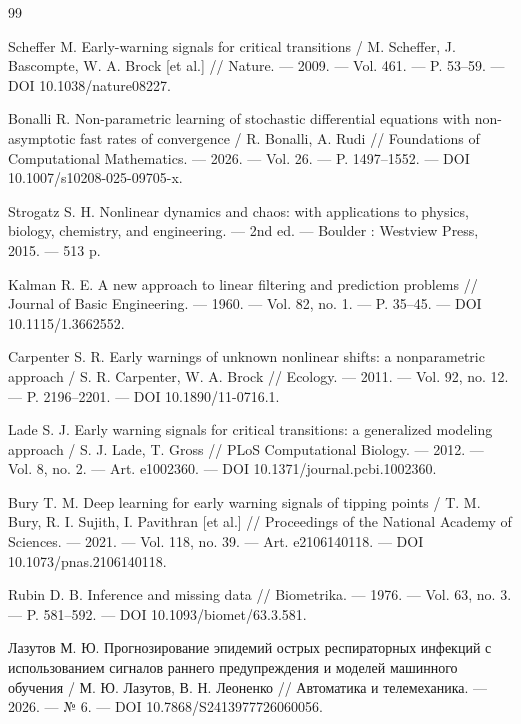 \documentclass[12pt,a4paper]{article}
\numberwithin{table}{section}
\numberwithin{figure}{section}
\renewcommand{\refname}{\centering СПИСОК ИСПОЛЬЗОВАННЫХ ИСТОЧНИКОВ}
\renewcommand{\refname}{\centering СПИСОК ИСПОЛЬЗОВАННЫХ ИСТОЧНИКОВ}%
\begin{document}
\renewcommand{\refname}{\centering СПИСОК ИСПОЛЬЗОВАННЫХ ИСТОЧНИКОВ}
\begin{thebibliography}{99}
\sloppy

Scheffer M. Early-warning signals for critical transitions / M. Scheffer,
J. Bascompte, W. A. Brock [et al.] // Nature. --- 2009. --- Vol. 461. ---
P. 53--59. --- DOI 10.1038/nature08227.

Bonalli R. Non-parametric learning of stochastic differential equations with
non-asymptotic fast rates of convergence / R. Bonalli, A. Rudi // Foundations
of Computational Mathematics. --- 2026. --- Vol. 26. --- P. 1497--1552. ---
DOI 10.1007/s10208-025-09705-x.

Strogatz S. H. Nonlinear dynamics and chaos: with applications to physics,
biology, chemistry, and engineering. --- 2nd ed. --- Boulder : Westview Press,
2015. --- 513 p.

Kalman R. E. A new approach to linear filtering and prediction problems //
Journal of Basic Engineering. --- 1960. --- Vol. 82, no. 1. --- P. 35--45. ---
DOI 10.1115/1.3662552.

Carpenter S. R. Early warnings of unknown nonlinear shifts: a nonparametric
approach / S. R. Carpenter, W. A. Brock // Ecology. --- 2011. --- Vol. 92,
no. 12. --- P. 2196--2201. --- DOI 10.1890/11-0716.1.

Lade S. J. Early warning signals for critical transitions: a generalized
modeling approach / S. J. Lade, T. Gross // PLoS Computational Biology. ---
2012. --- Vol. 8, no. 2. --- Art. e1002360. --- DOI
10.1371/journal.pcbi.1002360.

Bury T. M. Deep learning for early warning signals of tipping points /
T. M. Bury, R. I. Sujith, I. Pavithran [et al.] // Proceedings of the National
Academy of Sciences. --- 2021. --- Vol. 118, no. 39. --- Art. e2106140118. ---
DOI 10.1073/pnas.2106140118.

Rubin D. B. Inference and missing data // Biometrika. --- 1976. --- Vol. 63,
no. 3. --- P. 581--592. --- DOI 10.1093/biomet/63.3.581.

Лазутов М. Ю. Прогнозирование эпидемий острых респираторных инфекций с
использованием сигналов раннего предупреждения и моделей машинного обучения /
М. Ю. Лазутов, В. Н. Леоненко // Автоматика и телемеханика. --- 2026. ---
№ 6. --- DOI 10.7868/S2413977726060056.


\end{thebibliography}
\end{document}
